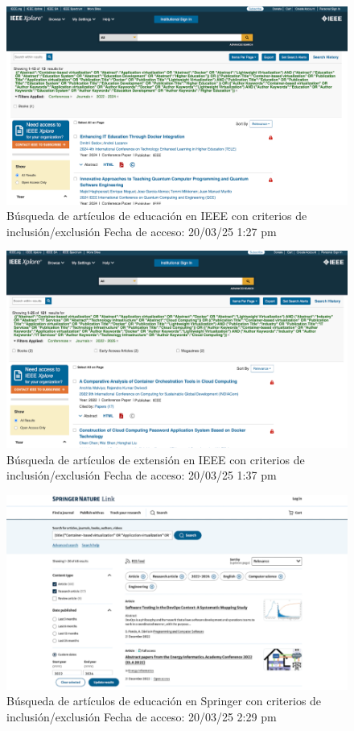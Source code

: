 \FloatBarrier\begin{figure}[H]
    \centering
    \includegraphics[width=\textwidth,keepaspectratio]{apendices/BD/criterios/IEEE-ed.png}
    \caption{Búsqueda de artículos de educación en IEEE con criterios de inclusión/exclusión
    Fecha de acceso: 20/03/25 1:27 pm
    }\label{fig:busqueda19}
\end{figure}
\FloatBarrier\begin{figure}[H]
    \centering
    \includegraphics[width=\textwidth,keepaspectratio]{apendices/BD/criterios/IEEE-ind.png}
    \caption{Búsqueda de artículos de extensión en IEEE con criterios de inclusión/exclusión
    Fecha de acceso: 20/03/25 1:37 pm
    }\label{fig:busqueda21}
\end{figure}
\FloatBarrier\begin{figure}[H]
    \centering
    \includegraphics[width=\textwidth,keepaspectratio]{apendices/BD/criterios/Springer-ed.png}
    \caption{Búsqueda de artículos de educación en Springer con criterios de inclusión/exclusión
    Fecha de acceso: 20/03/25 2:29 pm
    }\label{fig:busqueda22}
\end{figure}
